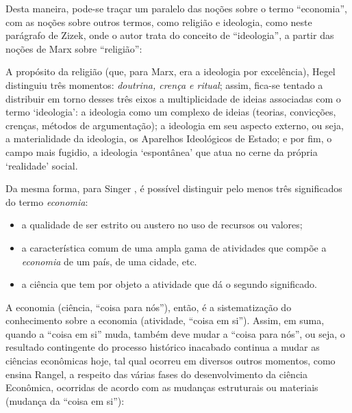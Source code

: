 \documentclass[
	12pt,				%
	oneside,			%
	a4paper,			%
	chapter=TITLE,		%
	section=TITLE,		%
	english,			%
	brazil				%
	]{abntex2}
\begin{document}
Desta maneira, pode-se traçar um paralelo das noções sobre o termo ``economia'',
com as noções sobre outros termos, como religião e ideologia, como neste
parágrafo de Zizek, onde o autor trata do conceito de ``ideologia'', a partir das
noções de Marx sobre ``religião'':
\begin{citacao}
A propósito da religião (que, para Marx, era a ideologia por excelência), Hegel
distinguiu três momentos: \emph{doutrina, crença e ritual}; assim, fica-se
tentado a distribuir em torno desses três eixos a multiplicidade de ideias
associadas com o termo `ideologia': a ideologia como um complexo de ideias
(teorias, convicções, crenças, métodos de argumentação); a ideologia em seu
aspecto externo, ou seja, a materialidade da ideologia, os Aparelhos Ideológicos
de Estado; e por fim, o campo mais fugidio, a ideologia `espontânea' que atua
no cerne da própria `realidade' social.
\cite[p.~15]{zizek}
\end{citacao}
Da mesma forma, para Singer \autocite*[7]{singer}, é possível distinguir pelo menos três
significados do termo \emph{economia}:
\begin{itemize}
\tightlist
\item
  a qualidade de ser estrito ou austero no uso de recursos ou valores;
\item
  a característica comum de uma ampla gama de atividades que compõe a \emph{economia}
  de um país, de uma cidade, etc.
\item
  a ciência que tem por objeto a atividade que dá o segundo significado.
\end{itemize}
A economia (ciência, ``coisa para nós''), então, é a sistematização do
conhecimento sobre a economia (atividade, ``coisa em si''). Assim, em suma, quando
a ``coisa em si'' muda, também deve mudar a ``coisa para nós'', ou seja, o resultado
contingente do processo histórico inacabado continua a mudar as ciências
econômicas hoje, tal qual ocorreu em diversos outros momentos, como ensina
Rangel, a respeito das várias fases do desenvolvimento da ciência Econômica,
ocorridas de acordo com as mudanças estruturais ou materiais (mudança da
``coisa em si''):
\end{document}
